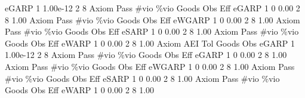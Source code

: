        eGARP {\VBAR}         1   1.00e-12          2          8 
{\smallskip}
{\smallskip}
{\smallskip}
       Axiom {\VBAR} Pass        \#vio        \%vio       Goods         Obs         Eff  
       eGARP {\VBAR}    1           0        0.00           2           8        1.00  
{\smallskip}
{\smallskip}
{\smallskip}
       Axiom {\VBAR} Pass        \#vio        \%vio       Goods         Obs         Eff  
      eWGARP {\VBAR}    1           0        0.00           2           8        1.00  
{\smallskip}
{\smallskip}
{\smallskip}
       Axiom {\VBAR} Pass        \#vio        \%vio       Goods         Obs         Eff  
       eSARP {\VBAR}    1           0        0.00           2           8        1.00  
{\smallskip}
{\smallskip}
{\smallskip}
       Axiom {\VBAR} Pass        \#vio        \%vio       Goods         Obs         Eff  
       eWARP {\VBAR}    1           0        0.00           2           8        1.00  
{\smallskip}
       Axiom {\VBAR}       AEI        Tol      Goods        Obs 
       eGARP {\VBAR}         1   1.00e-12          2          8 
{\smallskip}
{\smallskip}
{\smallskip}
       Axiom {\VBAR} Pass        \#vio        \%vio       Goods         Obs         Eff  
       eGARP {\VBAR}    1           0        0.00           2           8        1.00  
{\smallskip}
{\smallskip}
{\smallskip}
       Axiom {\VBAR} Pass        \#vio        \%vio       Goods         Obs         Eff  
      eWGARP {\VBAR}    1           0        0.00           2           8        1.00  
{\smallskip}
{\smallskip}
{\smallskip}
       Axiom {\VBAR} Pass        \#vio        \%vio       Goods         Obs         Eff  
       eSARP {\VBAR}    1           0        0.00           2           8        1.00  
{\smallskip}
{\smallskip}
{\smallskip}
       Axiom {\VBAR} Pass        \#vio        \%vio       Goods         Obs         Eff  
       eWARP {\VBAR}    1           0        0.00           2           8        1.00  
